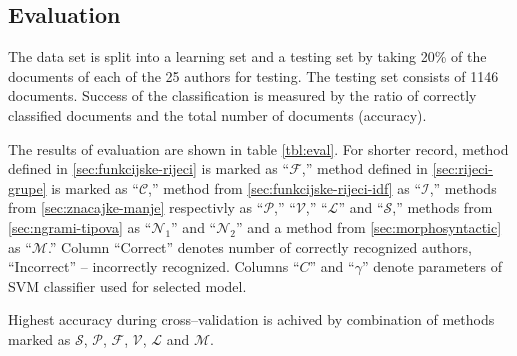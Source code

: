 \documentclass[11pt,english]{article}
\begin{document}
\begin{multicols}{2}
\section{Evaluation}
\label{sec:evaluacija}
The data set is split into a learning set and a testing set by taking 20\%
of the documents of each of the 25 authors for testing. The testing set consists of
1146 documents. Success of the classification is measured by the ratio of correctly
classified documents and the total number of documents (accuracy).

The results of evaluation are shown in table \ref{tbl:eval}. For shorter record,
method defined in \ref{sec:funkcijske-rijeci} is marked as ``$\mathcal{F}$,''
method defined in \ref{sec:rijeci-grupe} is marked as ``$\mathcal{C}$,'' method
from \ref{sec:funkcijske-rijeci-idf} as ``$\mathcal{I}$,'' methods from
\ref{sec:znacajke-manje} respectivly as ``$\mathcal{P}$,'' ``$\mathcal{V}$,'' 
``$\mathcal{L}$'' and ``$\mathcal{S}$,'' methods from \ref{sec:ngrami-tipova} as 
``$\mathcal{N}_1$'' and ``$\mathcal{N}_2$'' and a method from
\ref{sec:morphosyntactic} as ``$\mathcal{M}$.'' Column ``Correct'' denotes
number of correctly recognized authors, ``Incorrect'' -- incorrectly recognized.
Columns ``$C$'' and ``$\gamma$'' denote parameters of SVM classifier used for
selected model.

Highest accuracy during cross--validation is achived by combination of
methods marked as $\mathcal{S}$, $\mathcal{P}$, $\mathcal{F}$, $\mathcal{V}$,
$\mathcal{L}$ and $\mathcal{M}$.

% 
% 


\end{multicols}
\end{document}
